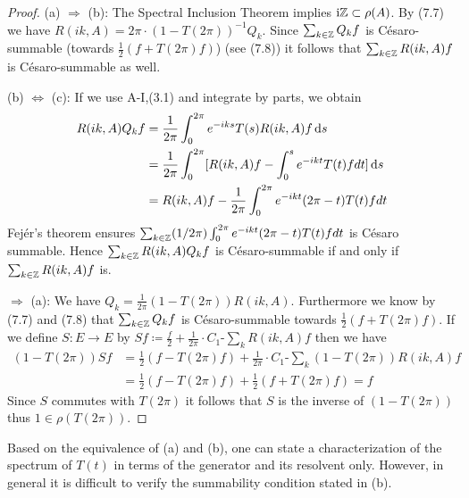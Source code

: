 \begin{proof}
(a) $\Rightarrow$ (b): The Spectral Inclusion Theorem implies $\mathrm{i}\mathbb{Z} \subset \rho(A)$.
By (7.7) we have $R(ik,A) = 2\pi\cdot(1-T(2\pi))^{-1}Q_{k}$.
Since $\sum_{k\in\mathbb{Z}} Q_{k}f$ is Césaro-summable (towards $\frac{1}{2}(f + T(2\pi)f)$) (see (7.8)) it follows that $\sum_{k\in\mathbb{Z}} R(ik,A)f$ is Césaro-summable as well.

(b) $\Leftrightarrow$ (c): If we use A-I,(3.1) and integrate by parts, we obtain
\begin{align*}
R(ik,A)Q_{k}f &= \frac{1}{2\pi}\int_{0}^{2\pi} e^{-iks} T(s)R(ik,A)f \mathop{}\!\mathrm{d}{s} \\
&= \frac{1}{2\pi}\int_{0}^{2\pi} [R(ik,A)f - \int_{0}^{s} e^{-ikt} T(t)f dt] \mathop{}\!\mathrm{d}{s} \\
&= R(ik,A)f - \frac{1}{2\pi}\int_{0}^{2\pi} e^{-ikt} (2\pi-t) T(t)f dt
\end{align*}
Fejér's theorem ensures $\sum_{k\in\mathbb{Z}} (1/2\pi)\int_{0}^{2\pi} e^{-ikt} (2\pi-t) T(t)f dt$ is Césaro summable.
Hence $\sum_{k\in\mathbb{Z}} R(ik,A)Q_{k}f$ is Césaro-summable if and only if $\sum_{k\in\mathbb{Z}} R(ik,A)f$ is.

$\Rightarrow$ (a): We have $Q_{k} = \frac{1}{2\pi}(1 - T(2\pi))R(ik,A)$.
Furthermore we know by (7.7) and (7.8) that $\sum_{k\in\mathbb{Z}} Q_{k}f$ is Césaro-summable towards $\frac{1}{2}(f + T(2\pi)f)$.
If we define $S \colon E \to E$ by $Sf \coloneqq \frac{f}{2} + \frac{1}{2\pi}\cdot C_{1}\text{-}\sum_k R(ik,A)f$ then we have
\begin{align*}
(1 - T(2\pi))Sf &= \frac{1}{2}(f - T(2\pi)f) + \frac{1}{2\pi}\cdot C_{1}\text{-}\sum_k (1 - T(2\pi))R(ik,A)f \\
&= \frac{1}{2}(f - T(2\pi)f) + \frac{1}{2}(f + T(2\pi)f) = f
\end{align*}
Since $S$ commutes with $T(2\pi)$ it follows that $S$ is the inverse of $(1 - T(2\pi))$ thus $1 \in \rho(T(2\pi))$.
\end{proof}
Based on the equivalence of (a) and (b), one can state a characterization of the spectrum of $T(t)$ in terms of the generator and its resolvent only.
However, in general it is difficult to verify the summability condition stated in (b).

